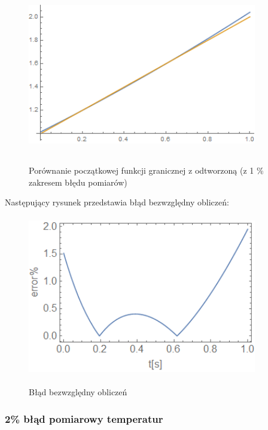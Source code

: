 \documentclass[twoside]{projektInzynierskiMS1}
\begin{document}
\begin{figure}[H]
\begin{center}
		\includegraphics[height=7cm, width=10cm]{1reconstruction.png}\\
	\caption{Porównanie początkowej funkcji granicznej z odtworzoną (z 1 \% zakresem błędu pomiarów)}
\end{center}
\end{figure}

Następujący rysunek przedstawia błąd bezwzględny obliczeń: \\

\begin{figure}[H]
\begin{center}
		\includegraphics[height=7cm, width=10cm]{1abs.png}\\
	\caption{Błąd bezwzględny obliczeń}
\end{center}
\end{figure}



\subsubsection{2\% błąd pomiarowy temperatur}
\end{document}
